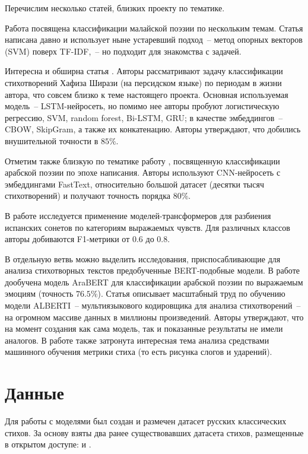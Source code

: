 \documentclass[a4paper,12pt]{article}
\begin{document}
Перечислим несколько статей, близких проекту по тематике.

Работа \cite{noraini2012} посвящена классификации малайской поэзии по нескольким темам. Статья написана давно и использует ныне устаревший подход~-- метод опорных векторов (SVM) поверх TF-IDF,~-- но подходит для знакомства с задачей.

Интересна и обширна статья \cite{ruma2022}. Авторы рассматривают задачу классификации стихотворений Хафиза Ширази (на персидском языке) по периодам в жизни автора, что совсем близко к теме настоящего проекта. Основная используемая модель~-- LSTM-нейросеть, но помимо нее авторы пробуют логистическую регрессию, SVM, random forest, Bi-LSTM, GRU; в качестве эмбеддингов~-- CBOW, SkipGram, а также их конкатенацию. Авторы утверждают, что добились внушительной точности в $85 \%$.

Отметим также близкую по тематике работу \cite{orabi2020}, посвященную классификации арабской поэзии по эпохе написания. Авторы используют CNN-нейросеть с эмбеддингами FastText, относительно большой датасет (десятки тысяч стихотворений) и получают точность порядка $80 \%$.

В работе \cite{barbado2021} исследуется применение моделей-трансформеров для разбиения испанских сонетов по категориям выражаемых чувств. Для различных классов авторы добиваются F1-метрики от $0.6$ до $0.8$.

В отдельную ветвь можно выделить исследования, приспосабливающие для анализа стихотворных текстов предобученные BERT-подобные модели. В работе \cite{shahriar2023} дообучена модель AraBERT для классификации арабской поэзии по выражаемым эмоциям (точность $76.5 \%$). Статья \cite{rosa2023} описывает масштабный труд по обучению модели ALBERTI~-- мультиязыкового кодировщика для анализа стихотворений~-- на огромном массиве данных в миллионы произведений. Авторы утверждают, что на момент создания как сама модель, так и показанные результаты не имели аналогов. В работе также затронута интересная тема анализа средствами машинного обучения метрики стиха (то есть рисунка слогов и ударений).


\section{Данные}

Для работы с моделями был создан и размечен датасет русских классических стихов. За основу взяты два ранее существовавших датасета стихов, размещенные в открытом доступе: \cite{russian_poetry_corpus} и \cite{russian_poems_19000}.
\end{document}
